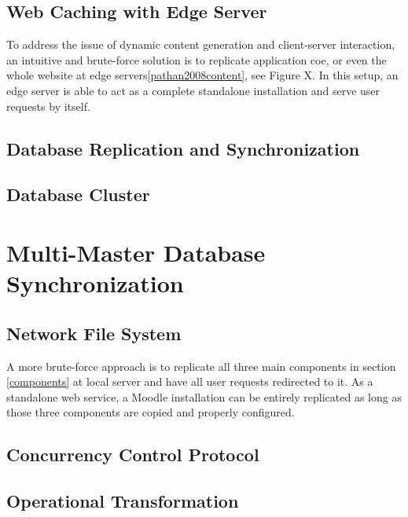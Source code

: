 
\subsection{Web Caching with Edge Server}
To address the issue of dynamic content generation and client-server interaction, an intuitive and brute-force solution is to replicate application coe, or even the whole website at edge servers\ref{pathan2008content}, see Figure X. In this setup, an edge server is able to act as a complete standalone installation and serve user requests by itself. 


\subsection{Database Replication and Synchronization}

\subsection{Database Cluster}

\section{Multi-Master Database Synchronization}

\subsection{Network File System}
A more brute-force approach is to replicate all three main components in section \ref{components} at local server and have all user requests redirected to it. As a standalone web service, a Moodle installation can be entirely replicated as long as those three components are copied and properly configured.
\subsection{Concurrency Control Protocol}

\subsection{Operational Transformation}

